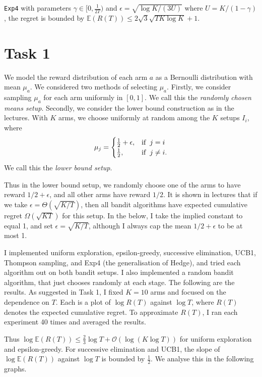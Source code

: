 \documentclass[10pt]{article}
\newcommand{\EE}{\mathbb{E}}
\newcommand{\bigoh}{\mathcal{O}}
\begin{document}
\verb'Exp4' with parameters $\gamma \in [0, \frac{1}{2T})$ and $\epsilon =
\sqrt{\log K / (3 U)}$ where $U = K / (1-\gamma)$, the regret is bounded by $\EE
(R(T)) \le 2 \sqrt{3} \sqrt{T K \log K} + 1$.

\section{Task 1}

We model the reward distribution of each arm $a$ as a Bernoulli distribution
with mean $\mu_a$. We considered two methods of selecting $\mu_a$. Firstly, we
consider sampling $\mu_a$ for each arm uniformly in $[0,1]$. We call this the
\emph{randomly chosen means setup}. Secondly, we consider the lower bound
construction as in the lectures. With $K$ arms, we choose uniformly at random
among the $K$ setups $I_i$, where
\begin{align*}
    \mu_j =
    \begin{cases}
        \frac{1}{2} + \epsilon, & \textrm{if} \hspace{0.2cm} j = i \\
        \frac{1}{2}, & \textrm{if} \hspace{0.2cm} j \not= i.
    \end{cases}
\end{align*}
We call this the \emph{lower bound setup}.

Thus in the lower bound setup, we randomly choose one of the arms to have reward
$1/2 + \epsilon$, and all other arms have reward $1/2$. It is shown in lectures
that if we take $\epsilon = \Theta(\sqrt{K/T})$, then all bandit algorithms have
expected cumulative regret $\Omega(\sqrt{K T})$ for this setup. In the below, I
take the implied constant to equal 1, and set $\epsilon = \sqrt{K/T}$, although
I always cap the mean $1/2 + \epsilon$ to be at most 1.

I implemented uniform exploration, epsilon-greedy, successive elimination, UCB1,
Thompson sampling, and Exp4 (the generalisation of Hedge), and tried each
algorithm out on both bandit setups. I also implemented a random bandit
algorithm, that just chooses randomly at each stage. The following are the
results. As suggested in Task 1, I fixed $K = 10$ arms and focused on the
dependence on $T$. Each is a plot of $\log R(T)$ against $\log T$, where $R(T)$
denotes the expected cumulative regret. To approximate $R(T)$, I ran each
experiment 40 times and averaged the results.

Thus $\log \EE( R(T) ) \le \frac{2}{3} \log T + \bigoh(\log (K \log T))$ for
uniform exploration and epsilon-greedy. For successive elimination and UCB1, the
slope of $\log \EE( R(T))$ against $\log T$ is bounded by $\frac{1}{2}$. We
analyse this in the following graphs.
\end{document}
